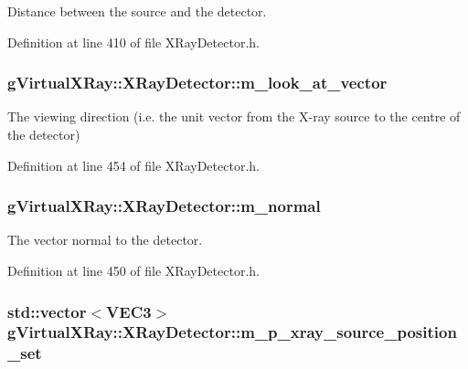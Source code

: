 Distance between the source and the detector. 



Definition at line 410 of file XRayDetector.h.

\hypertarget{classg_virtual_x_ray_1_1_x_ray_detector_a68163c9f1a543baef07c24388476b85f}{
\subsubsection[{m\_\-look\_\-at\_\-vector}]{ {\bf gVirtualXRay::XRayDetector::m\_\-look\_\-at\_\-vector}}}
\label{classg_virtual_x_ray_1_1_x_ray_detector_a68163c9f1a543baef07c24388476b85f}


The viewing direction (i.e. the unit vector from the X-\/ray source to the centre of the detector) 



Definition at line 454 of file XRayDetector.h.

\hypertarget{classg_virtual_x_ray_1_1_x_ray_detector_a4e6928c0c2347c9371f320c72d334411}{
\subsubsection[{m\_\-normal}]{ {\bf gVirtualXRay::XRayDetector::m\_\-normal}}}
\label{classg_virtual_x_ray_1_1_x_ray_detector_a4e6928c0c2347c9371f320c72d334411}


The vector normal to the detector. 



Definition at line 450 of file XRayDetector.h.

\hypertarget{classg_virtual_x_ray_1_1_x_ray_detector_a2669db81b788d9bf9e3f91ffc7a385d5}{
\subsubsection[{m\_\-p\_\-xray\_\-source\_\-position\_\-set}]{\setlength{\rightskip}{0pt plus 5cm}std::vector$<${\bf VEC3}$>$ {\bf gVirtualXRay::XRayDetector::m\_\-p\_\-xray\_\-source\_\-position\_\-set}}}
\label{classg_virtual_x_ray_1_1_x_ray_detector_a2669db81b788d9bf9e3f91ffc7a385d5}


